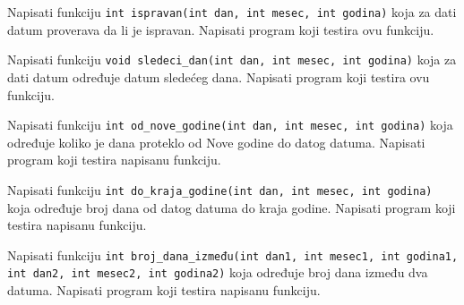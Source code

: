 \begin{Exercise}[label=p1.4_] 
Napisati funkciju \verb|int ispravan(int dan, int mesec, int godina)|
koja za dati datum proverava da li je ispravan. Napisati program koji testira ovu funkciju. \\ 
\end{Exercise}
\begin{Answer}[ref=p1.4_]
\end{Answer}


\begin{Exercise}[label=p1.4_] 
Napisati funkciju
\verb|void sledeci_dan(int dan, int mesec, int godina)| koja za dati
datum određuje datum sledećeg dana. Napisati program koji testira ovu funkciju. \\ 
\end{Exercise}
\begin{Answer}[ref=p1.4_]
\end{Answer}

\begin{Exercise}[label=p1.4_] 
Napisati funkciju
\verb|int od_nove_godine(int dan, int mesec, int godina)| koja određuje koliko je dana proteklo od Nove godine do datog datuma. Napisati program koji testira napisanu funkciju. \\ 
\end{Exercise}
\begin{Answer}[ref=p1.4_]
\end{Answer}

\begin{Exercise}[label=p1.4_] 
Napisati funkciju
\verb|int do_kraja_godine(int dan, int mesec, int godina)| koja određuje broj dana od datog datuma do kraja godine. Napisati program koji testira napisanu funkciju. \\ 
\end{Exercise}
\begin{Answer}[ref=p1.4_]
\end{Answer}

\begin{Exercise}[label=p1.4_] 
Napisati funkciju
\verb|int broj_dana_između(int dan1, int mesec1, int godina1,|
\verb|int dan2, int mesec2, int godina2)| koja određuje broj dana
između dva datuma. Napisati program koji testira napisanu funkciju. \\ 
\end{Exercise}
\begin{Answer}[ref=p1.4_]
\end{Answer}


